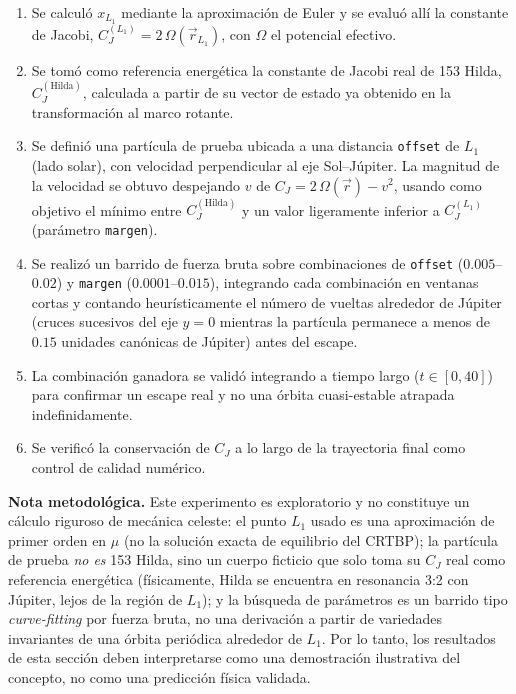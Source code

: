 \documentclass[12pt,a4paper]{article}
\begin{document}
\begin{enumerate}
  \item Se calculó \(x_{L_1}\) mediante la aproximación de Euler y se evaluó allí la constante de Jacobi, \(C_J^{(L_1)}=2\,\Omega(\vec r_{L_1})\), con \(\Omega\) el potencial efectivo.
  \item Se tomó como referencia energética la constante de Jacobi real de 153 Hilda, \(C_J^{(\text{Hilda})}\), calculada a partir de su vector de estado ya obtenido en la transformación al marco rotante.
  \item Se definió una partícula de prueba ubicada a una distancia \texttt{offset} de \(L_1\) (lado solar), con velocidad perpendicular al eje Sol--Júpiter. La magnitud de la velocidad se obtuvo despejando \(v\) de \(C_J=2\,\Omega(\vec r)-v^2\), usando como objetivo el mínimo entre \(C_J^{(\text{Hilda})}\) y un valor ligeramente inferior a \(C_J^{(L_1)}\) (parámetro \texttt{margen}).
  \item Se realizó un barrido de fuerza bruta sobre combinaciones de \texttt{offset} (\(0.005\)--\(0.02\)) y \texttt{margen} (\(0.0001\)--\(0.015\)), integrando cada combinación en ventanas cortas y contando heurísticamente el número de vueltas alrededor de Júpiter (cruces sucesivos del eje \(y=0\) mientras la partícula permanece a menos de \(0.15\) unidades canónicas de Júpiter) antes del escape.
  \item La combinación ganadora se validó integrando a tiempo largo (\(t\in[0,40]\)) para confirmar un escape real y no una órbita cuasi-estable atrapada indefinidamente.
  \item Se verificó la conservación de \(C_J\) a lo largo de la trayectoria final como control de calidad numérico.
\end{enumerate}

\textbf{Nota metodológica.} Este experimento es exploratorio y no constituye un cálculo riguroso de mecánica celeste: el punto \(L_1\) usado es una aproximación de primer orden en \(\mu\) (no la solución exacta de equilibrio del CRTBP); la partícula de prueba \emph{no es} 153 Hilda, sino un cuerpo ficticio que solo toma su \(C_J\) real como referencia energética (físicamente, Hilda se encuentra en resonancia 3:2 con Júpiter, lejos de la región de \(L_1\)); y la búsqueda de parámetros es un barrido tipo \emph{curve-fitting} por fuerza bruta, no una derivación a partir de variedades invariantes de una órbita periódica alrededor de \(L_1\). Por lo tanto, los resultados de esta sección deben interpretarse como una demostración ilustrativa del concepto, no como una predicción física validada.
\end{document}
